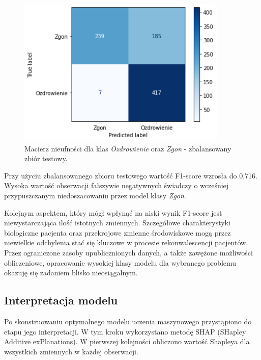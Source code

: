 \documentclass[polish, twoside, 12pt, a4paper]{article}
\theoremstyle{definition}
\theoremstyle{plain}
\theoremstyle{remark}
\begin{document}
\begin{figure}[H]
\centering
\includegraphics[width=10cm]{conf_matrix_balanced.png}
\caption{Macierz nieufności dla klas \emph{Ozdrowienie} oraz \emph{Zgon} - zbalansowany zbiór testowy.}
\end{figure}

Przy użyciu zbalansowanego zbioru testowego wartość F1-score wzrosła do 0,716. Wysoka wartość obserwacji fałszywie negatywnych świadczy o wcześniej przypuszczanym niedoszacowaniu przez model klasy \emph{Zgon}.

Kolejnym aspektem, który mógł wpłynąć na niski wynik F1-score jest niewystarczająca ilość istotnych zmiennych. Szczegółowe charakterystyki biologiczne pacjenta oraz przekrojowe zmienne środowiskowe mogą przez niewielkie odchylenia stać się kluczowe w procesie rekonwalescencji pacjentów. Przez ograniczone zasoby upublicznionych danych, a także zawężone możliwości obliczeniowe, opracowanie wysokiej klasy modelu dla wybranego problemu okazuję się zadaniem blisko nieosiągalnym.

\subsection{Interpretacja modelu}

Po skonstruowaniu optymalnego modelu uczenia maszynowego przystąpiono do etapu jego interpretacji. W tym kroku wykorzystano metodę SHAP (SHapley Additive exPlanations). W pierwszej kolejności obliczono wartość Shapleya dla wszystkich zmiennych w każdej obserwacji. 
\end{document}

